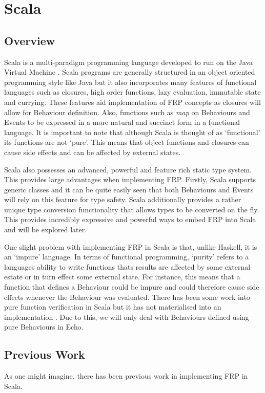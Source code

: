 \chapter{Scala}
  
  \section{Overview}
    Scala is a multi-paradigm programming language developed to run on the Java Virtual Machine \cite{Odersky2004}. Scala 
    programs are
    generally structured in an object oriented programming style like Java but it also incorporates many features of
    functional languages such as closures, high order functions, lazy evaluation, immutable state and currying. These features 
    aid
    implementation of FRP concepts as closures will allow for Behaviour definition. Also, functions such as \emph{map} on
    Behaviours and Events to be expressed in a more natural and succinct form in a functional language. It is
    important to note that although Scala is thought of as `functional' its functions are not `pure'. This means
    that object functions and closures can cause side effects and can be affected by external states.

    Scala also possesses an advanced, powerful and feature rich static type system. This provides large
    advantages when implementing FRP. Firstly, Scala supports generic classes and it can be quite easily seen
    that both Behaviours and Events will rely on this feature for type safety. Scala additionally provides
    a rather unique type conversion functionality that allows types to be converted on the fly. This provides
    incredibly expressive and powerful ways to embed FRP into Scala and will be explored later.
    
    One slight problem with implementing FRP in Scala is that, unlike Haskell, it is an `impure'
    language. In terms of functional programming, `purity' refers to a languages ability to write functions
    thats results are affected by some external estate or in turn effect some external state. For instance,
    this means that a function that defines a Behaviour could be impure and could therefore cause side effects
    whenever the Behaviour was evaluated. There has been some work into pure function verification in Scala but it has not materialised into an  
    implementation \cite{Nordenberg}. Due to this, we will only deal with Behaviours defined using pure Behaviours in Echo.
     
  \section{Previous Work}
    As one might imagine, there has been previous work in implementing FRP in Scala. 
    
